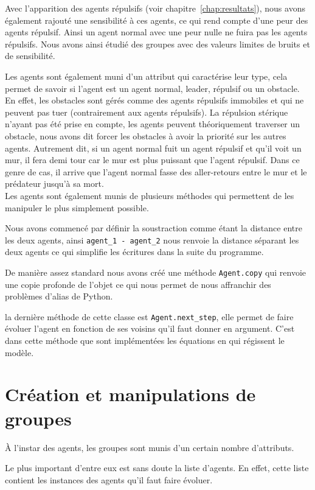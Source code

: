 \documentclass[french, a4paper, 12pt, openany]{report}
\begin{document}
	Avec l'apparition des agents répulsifs (voir chapitre~\ref{chap:resultats}), nous avons également rajouté une sensibilité à ces agents, ce qui rend compte d'une peur des agents répulsif. Ainsi un agent normal avec une peur nulle ne fuira pas les agents répulsifs. Nous avons ainsi étudié des groupes avec des valeurs limites de bruits et de sensibilité.
	
	Les agents sont également muni d'un attribut qui caractérise leur type, cela permet de savoir si l'agent est un agent normal, leader, répulsif ou un obstacle. En effet, les obstacles sont gérés comme des agents répulsifs immobiles et qui ne peuvent pas tuer (contrairement aux agents répulsifs). La répulsion stérique n'ayant pas été prise en compte, les agents peuvent théoriquement traverser un obstacle, nous avons dit forcer les obstacles à avoir la priorité sur les autres agents. Autrement dit, si un agent normal fuit un agent répulsif et qu'il voit un mur, il fera demi tour car le mur est plus puissant que l'agent répulsif. Dans ce genre de cas, il arrive que l'agent normal fasse des aller-retours entre le mur et le prédateur jusqu'à sa mort. \\
	
	Les agents sont également munis de plusieurs méthodes qui permettent de les manipuler le plus simplement possible.
	
	Nous avons commencé par définir la soustraction comme étant la distance entre les deux agents, ainsi \verb|agent_1 - agent_2| nous renvoie la distance séparant les deux agents ce qui simplifie les écritures dans la suite du programme.
	
	De manière assez standard nous avons créé une méthode \verb|Agent.copy| qui renvoie une copie profonde de l'objet ce qui nous permet de nous affranchir des problèmes d'alias de Python.
	
	la dernière méthode de cette classe est \verb|Agent.next_step|, elle permet de faire évoluer l'agent en fonction de ses voisins qu'il faut donner en argument. C'est dans cette méthode que sont implémentées les équations en qui régissent le modèle.
	
\section{Création et manipulations de groupes}
	À l'instar des agents, les groupes sont munis d'un certain nombre d'attributs.
	
	Le plus important d'entre eux est sans doute la liste d'agents. En effet, cette liste contient les instances des agents qu'il faut faire évoluer.
	
\end{document}
